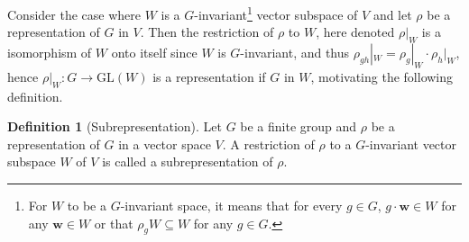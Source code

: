 \documentclass[12pt, a4paper, twoside]{article}
\theoremstyle{definition}
\newtheorem{definition}{Definition}[section]
\theoremstyle{remark}
\numberwithin{equation}{section}
\newcommand{\1}{\mathbf{1}}
\newcommand{\0}{\mathbf{0}}
\newcommand{\GL}{\text{GL}}
\newcommand{\wvec}{\mathbf{w}}
\begin{document}
	
	
	
	
	
	Consider the case where $W$ is a $G$-invariant\footnote{For $W$ to be a $G$-invariant space, it means that for every $g \in G$, $g \cdot \wvec \in W$ for any $\wvec \in W$ or that $\rho_g W \subseteq W$ for any $g\in G$.} vector subspace of $V$%
	and let $\rho$ be a representation of $G$ in $V$. Then the restriction of $\rho$ to $W$, here denoted $\rho|_W$ is a isomorphism of $W$ onto itself since $W$ is $G$-invariant, and thus $\rho_{gh}|_W = \rho_g|_W \cdot \rho_h|_W$, hence $\rho|_W: G \rightarrow \GL(W)$ is a representation if $G$ in $W$, motivating the following definition.
	
	\begin{definition}[Subrepresentation]\label{def:subrepr}
		Let $G$ be a finite group and $\rho$ be a representation of $G$ in a vector space $V$. A restriction of $\rho$ to a $G$-invariant vector subspace $W$ of $V$ is called a subrepresentation of $\rho$.
	\end{definition}
	
\end{document}
